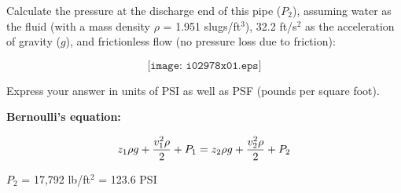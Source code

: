 

Calculate the pressure at the discharge end of this pipe ($P_2$), assuming water as the fluid (with a mass density $\rho$ = 1.951 slugs/ft$^{3}$), 32.2 ft/s$^{2}$ as the acceleration of gravity ($g$), and frictionless flow (no pressure loss due to friction):

$$\texttt{[image: i02978x01.eps]}$$

Express your answer in units of PSI as well as PSF (pounds per square foot).

\vskip 10pt

\noindent
{\bf Bernoulli's equation:}

$$z_1 \rho g + {v_1^2 \rho \over 2} + P_1 = z_2 \rho g + {v_2^2 \rho \over 2} + P_2$$







$P_2$ = 17,792 lb/ft$^{2}$ = 123.6 PSI










